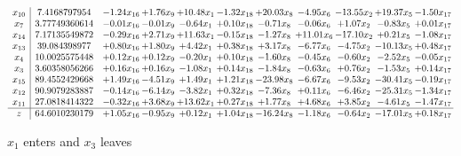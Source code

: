 \documentclass[9pt]{article}
\begin{document}
 \[\begin{array}{c| c c@{\hskip 2pt} c@{\hskip 2pt} c@{\hskip 2pt} c@{\hskip 2pt} c@{\hskip 2pt} c@{\hskip 2pt} c@{\hskip 2pt} c@{\hskip 2pt} c@{\hskip 2pt} }
 x_{10}   &  7.4168797954 & -1.24 x_{16} & +  1.76 x_{9} & + 10.48 x_{1} & -1.32 x_{18} & + 20.03 x_{8} & -4.95 x_{6} & -13.55 x_{2} & + 19.37 x_{5} & -1.50 x_{17}\\
 x_{7}   &  3.77749360614 & -0.01 x_{16} & -0.01 x_{9} & -0.64 x_{1} & +  0.10 x_{18} & -0.71 x_{8} & -0.06 x_{6} & +  1.07 x_{2} & -0.83 x_{5} & +  0.01 x_{17}\\
 x_{14}   &  7.17135549872 & -0.29 x_{16} & +  2.71 x_{9} & + 11.63 x_{1} & -0.15 x_{18} & -1.27 x_{8} & + 11.01 x_{6} & -17.10 x_{2} & +  0.21 x_{5} & -1.08 x_{17}\\
 x_{13}   &  39.084398977 & +  0.80 x_{16} & +  1.80 x_{9} & +  4.42 x_{1} & +  0.38 x_{18} & +  3.17 x_{8} & -6.77 x_{6} & -4.75 x_{2} & -10.13 x_{5} & +  0.48 x_{17}\\
 x_{4}   &  10.0025575448 & +  0.12 x_{16} & +  0.12 x_{9} & -0.20 x_{1} & +  0.10 x_{18} & -1.60 x_{8} & -0.45 x_{6} & -0.60 x_{2} & -2.52 x_{5} & -0.05 x_{17}\\
 x_{3}   &  3.60358056266 & +  0.16 x_{16} & +  0.16 x_{9} & -1.08 x_{1} & +  0.14 x_{18} & -1.84 x_{8} & -0.63 x_{6} & +  0.76 x_{2} & -1.53 x_{5} & +  0.14 x_{17}\\
 x_{15}   &  89.4552429668 & +  1.49 x_{16} & -4.51 x_{9} & +  1.49 x_{1} & +  1.21 x_{18} & -23.98 x_{8} & -6.67 x_{6} & -9.53 x_{2} & -30.41 x_{5} & -0.19 x_{17}\\
 x_{12}   &  90.9079283887 & -0.14 x_{16} & -6.14 x_{9} & -3.82 x_{1} & +  0.32 x_{18} & -7.36 x_{8} & +  0.11 x_{6} & -6.46 x_{2} & -25.31 x_{5} & -1.34 x_{17}\\
 x_{11}   &  27.0818414322 & -0.32 x_{16} & +  3.68 x_{9} & + 13.62 x_{1} & +  0.27 x_{18} & +  1.77 x_{8} & +  4.68 x_{6} & +  3.85 x_{2} & -4.61 x_{5} & -1.47 x_{17}\\
\hline
z    &  64.6010230179 & +  1.05 x_{16} & -0.95 x_{9} & +  0.12 x_{1} & +  1.04 x_{18} & -16.24 x_{8} & -1.18 x_{6} & -0.64 x_{2} & -17.01 x_{5} & +  0.18 x_{17}\\
\end{array}\]


 $ x_{1} $ enters and $ x_{3} $ leaves 
\end{document}
